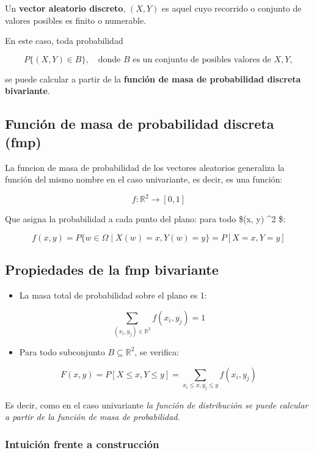 \documentclass[
  a4paper,
  DIV=11,
  numbers=noendperiod]{scrreprt}
\providecommand{\tightlist}{%
  \setlength{\itemsep}{0pt}\setlength{\parskip}{0pt}}\usepackage{longtable,booktabs,array}
\begin{document}
Un \textbf{vector aleatorio discreto}, \((X, Y)\) es aquel cuyo
recorrido o conjunto de valores posibles es finito o numerable.

En este caso, toda probabilidad

\[
P\{(X, Y) \in B\}, \quad \text{donde } B \text{ es un conjunto de posibles valores de } X, Y,
\]

se puede calcular a partir de la \textbf{función de masa de probabilidad
discreta bivariante}.

\subsection{Función de masa de probabilidad discreta
(fmp)}\label{funciuxf3n-de-masa-de-probabilidad-discreta-fmp}

La funcion de masa de probabilidad de los vectores aleatorios generaliza
la función del mismo nombre en el caso univariante, es decir, es una
función:

\[
f: \mathbb{R}^2 \to [0, 1]
\]

Que asigna la probabilidad a cada punto del plano: para todo \$(x, y)
\in {}\^{}2 \$:

\[
f(x, y) = P\{w \in \Omega \mid X(w) = x, Y(w) = y\} = P[X = x, Y = y]
\]

\subsection{Propiedades de la fmp
bivariante}\label{propiedades-de-la-fmp-bivariante}

\begin{itemize}
\tightlist
\item
  La masa total de probabilidad sobre el plano es 1:
\end{itemize}

\[
\sum_{(x_i, y_j) \in \mathbb{R}^2} f(x_i, y_j) = 1
\]

\begin{itemize}
\tightlist
\item
  Para todo subconjunto \(B \subseteq \mathbb{R}^2\), se verifica:
\end{itemize}

\[
F(x, y) = P[X \leq x, Y \leq y] = \sum_{x_i \leq x, y_j \leq y} f(x_i, y_j)
\]

Es decir, como en el caso univariante \emph{la función de distribución
se puede calcular a partir de la función de masa de probabilidad}.

\subsubsection{Intuición frente a
construcción}\label{intuiciuxf3n-frente-a-construcciuxf3n}
\end{document}
